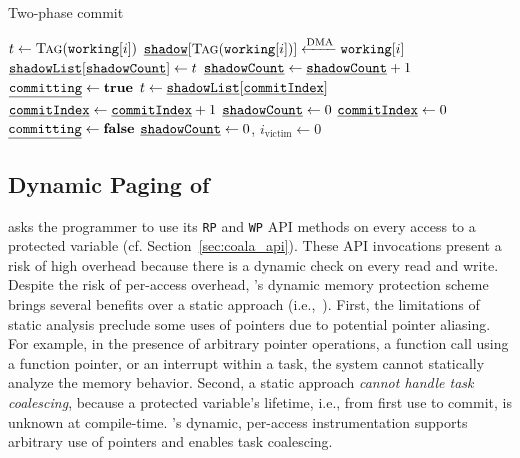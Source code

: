 \begin{algorithm}[t]
	\caption{Two-phase commit}
	\label{algo:commit}
	\small
	\begin{algorithmic}[1]
         
                \State $t \gets \Call{Tag}{\texttt{working}[i]}$
                \State $\texttt{\underline{shadow}}[\Call{Tag}{\texttt{working}[i]}] \xleftarrow{\text{DMA}} \texttt{working}[i]$
                \State $\texttt{\underline{shadowList}}[\texttt{\underline{shadowCount}}] \gets t$
                \State $\texttt{\underline{shadowCount}} \gets \texttt{\underline{shadowCount}} + 1$
            \EndFor
            \State {}
        \EndProcedure
         
            \State $\texttt{\underline{committing}} \gets \textbf{true}$
                \State $t \gets \texttt{\underline{shadowList}}[\texttt{\underline{commitIndex}}]$
                \State {}
                \State $\texttt{\underline{commitIndex}} \gets \texttt{\underline{commitIndex}} + 1$
            \EndWhile
            \State $\texttt{\underline{shadowCount}} \gets 0$
            \State $\texttt{\underline{commitIndex}} \gets 0$
            \State $\texttt{\underline{committing}} \gets \textbf{false}$
        \EndProcedure
         
             
            \EndIf
            \State $\texttt{\underline{shadowCount}} \gets 0$, $i_\text{victim} \gets 0$
        \EndProcedure
	\end{algorithmic}
\end{algorithm}

\subsection{Dynamic Paging of \sys}

\sys asks the programmer to use its {\tt RP} and {\tt WP} API methods on every access to a protected variable (cf. Section~\ref{sec:coala_api}). These API invocations present a risk of high overhead because there is a dynamic check on every read and write. Despite the risk of per-access overhead, \sys's dynamic memory protection scheme brings several benefits over a static approach (i.e.,~\cite{alpaca}). First, the limitations of static analysis preclude some uses of pointers due to potential pointer aliasing. For example, in the presence of arbitrary pointer operations, a function call using a function pointer, or an interrupt within a task, the system cannot statically analyze the memory behavior. Second, a static approach \textit{cannot handle task coalescing}, because a protected variable's lifetime, i.e., from first use to commit, is unknown at compile-time. \sys's dynamic, per-access instrumentation supports arbitrary use of pointers and enables task coalescing.
